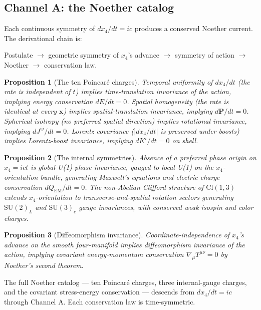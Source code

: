 \documentclass[11pt,a4paper]{article}
\newtheorem{proposition}{Proposition}
\begin{document}
\subsection{Channel A: the Noether catalog}

Each continuous symmetry of $dx_4/dt = ic$ produces a conserved Noether current. The derivational chain is:
\begin{center}
Postulate $\to$ geometric symmetry of $x_4$'s advance $\to$ symmetry of action $\to$ Noether $\to$ conservation law.
\end{center}

\begin{proposition}[The ten Poincar\'e charges]
\label{prop:poincare}
Temporal uniformity of $dx_4/dt$ (the rate is independent of $t$) implies time-translation invariance of the action, implying energy conservation $dE/dt = 0$. Spatial homogeneity (the rate is identical at every $\mathbf{x}$) implies spatial-translation invariance, implying $d\mathbf{P}/dt = 0$. Spherical isotropy (no preferred spatial direction) implies rotational invariance, implying $dJ^{ij}/dt = 0$. Lorentz covariance ($|dx_4/dt|$ is preserved under boosts) implies Lorentz-boost invariance, implying $dK^i/dt = 0$ on shell.
\end{proposition}

\begin{proposition}[The internal symmetries]
\label{prop:internal}
Absence of a preferred phase origin on $x_4 = ict$ is global U(1) phase invariance, gauged to local U(1) on the $x_4$-orientation bundle, generating Maxwell's equations and electric charge conservation $dQ_{\text{EM}}/dt = 0$. The non-Abelian Clifford structure of $\mathrm{Cl}(1,3)$ extends $x_4$-orientation to transverse-and-spatial rotation sectors generating $\mathrm{SU}(2)_L$ and $\mathrm{SU}(3)_c$ gauge invariances, with conserved weak isospin and color charges.
\end{proposition}

\begin{proposition}[Diffeomorphism invariance]
\label{prop:diffeo}
Coordinate-independence of $x_4$'s advance on the smooth four-manifold implies diffeomorphism invariance of the action, implying covariant energy-momentum conservation $\nabla_\mu T^{\mu\nu} = 0$ by Noether's second theorem.
\end{proposition}

The full Noether catalog --- ten Poincar\'e charges, three internal-gauge charges, and the covariant stress-energy conservation --- descends from $dx_4/dt = ic$ through Channel A. Each conservation law is time-symmetric.
\end{document}
